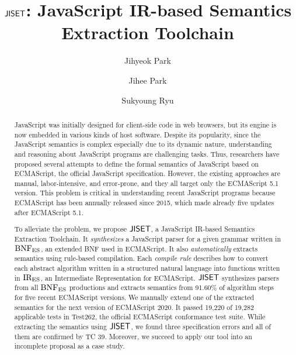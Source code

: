 \documentclass[sigconf,review,anonymous=true]{acmart}
\begin{document}
\title{\( \text{\sf JISET} \): JavaScript IR-based Semantics Extraction Toolchain}

\author{Jihyeok Park}

\author{Jihee Park}

\author{Sukyoung Ryu}

\begin{abstract}
JavaScript was initially designed for client-side code in web browsers,
but its engine is now embedded in various kinds of host software.
Despite its popularity, since the JavaScript semantics is complex
especially due to its dynamic nature, understanding and reasoning
about JavaScript programs are challenging tasks.  Thus,
researchers have proposed several attempts to define the formal semantics
of JavaScript based on ECMAScript, the official JavaScript specification.
However, the existing approaches are manual, labor-intensive, and
error-prone, and they all target only the ECMAScript 5.1 version.
This problem is critical in understanding recent JavaScript programs
because ECMAScript has been annually released since 2015, which made
already five updates after ECMAScript 5.1.

To alleviate the problem, we propose \( \text{\sf JISET} \), a JavaScript IR-based Semantics
Extraction Toolchain. It \textit{synthesizes} a JavaScript
parser for a given grammar written in \( \text{BNF}_{\text{ES}} \), an extended BNF
used in ECMAScript. It also \textit{automatically} extracts
semantics using rule-based compilation. Each \textit{compile rule}
describes how to convert each abstract algorithm written in a structured natural language
into functions written in \( \text{IR}_\text{ES} \), an Intermediate Representation
for ECMAScript. \( \text{\sf JISET} \) synthesizes parsers from all \( \text{BNF}_{\text{ES}} \) productions
and extracts semantics from 91.60\% of algorithm steps for five recent
ECMAScript versions. We manually extend one of the extracted semantics for
the next version of ECMAScript 2020. It passed 19,220 of 19,282 applicable tests
in Test262, the official ECMAScript conformance test suite. While extracting
the semantics using \( \text{\sf JISET} \), we found three specification errors
and all of them are confirmed by TC 39. Moreover, we succeed to apply
our tool into an incomplete proposal as a case study.
\end{abstract}


\maketitle










\normalem


\end{document}
